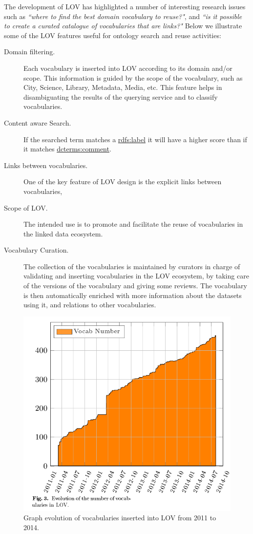 The development of LOV has highlighted a number of interesting research issues such as \textit{``where to find the best domain vocabulary to reuse?"}, and \textit{``is it possible to create a curated catalogue of vocabularies that are links?"}
Below we illustrate some of the LOV features useful for ontology search and reuse activities:

 \begin{description}
	\item [Domain filtering.] Each vocabulary is inserted into LOV according to its domain and/or scope. This information is guided by the scope of the vocabulary, such as City, Science, Library, Metadata, Media, etc. This feature helps in disambiguating the results of the querying service and to classify vocabularies.
	\item [Content aware Search.] If the searched term matches a \url{rdfs:label} it will have a higher score than if it matches \url{dcterms:comment}.
	\item [Links between vocabularies.] One of the key feature of LOV design is the explicit links between vocabularies,
	 \item [Scope of LOV.]The intended use is to promote and facilitate the reuse of vocabularies in the linked data ecosystem.
	 \item [Vocabulary Curation.]The collection of the vocabularies is maintained by curators in charge of validating and inserting vocabularies in the LOV ecosystem, by taking care of the versions of the vocabulary and giving some reviews. The vocabulary is then automatically enriched with more information about the datasets using it, and relations to other vocabularies.
 \end{description}


\begin{figure}[h!tb]
\centering
  \includegraphics[width=\linewidth]{img/LOVEvol.png}
  \caption{Graph evolution of vocabularies inserted into LOV from 2011 to 2014.}
  \label{fig:translations}
\end{figure}

